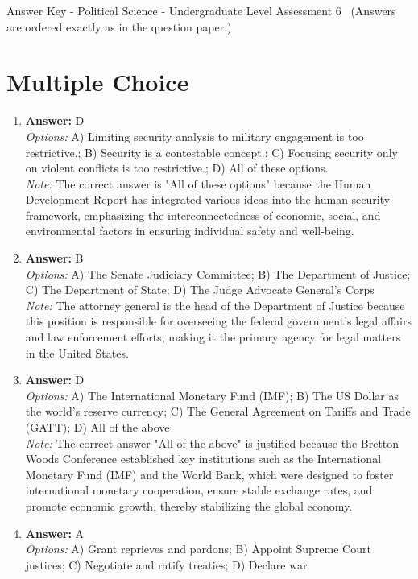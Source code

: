 \documentclass[12pt]{article}
\begin{document}
\begin{center}
Answer Key - Political Science - Undergraduate Level Assessment 6 \
\small (Answers are ordered exactly as in the question paper.)
\end{center}

\section*{Multiple Choice}
\begin{enumerate}[label=\arabic*.]
\item \textbf{Answer:} D
\\ \textit{Options:} A) Limiting security analysis to military engagement is too restrictive.; B) Security is a contestable concept.; C) Focusing security only on violent conflicts is too restrictive.; D) All of these options.
\\ \textit{Note:} The correct answer is "All of these options" because the Human Development Report has integrated various ideas into the human security framework, emphasizing the interconnectedness of economic, social, and environmental factors in ensuring individual safety and well-being.
\item \textbf{Answer:} B
\\ \textit{Options:} A) The Senate Judiciary Committee; B) The Department of Justice; C) The Department of State; D) The Judge Advocate General's Corps
\\ \textit{Note:} The attorney general is the head of the Department of Justice because this position is responsible for overseeing the federal government's legal affairs and law enforcement efforts, making it the primary agency for legal matters in the United States.
\item \textbf{Answer:} D
\\ \textit{Options:} A) The International Monetary Fund (IMF); B) The US Dollar as the world's reserve currency; C) The General Agreement on Tariffs and Trade (GATT); D) All of the above
\\ \textit{Note:} The correct answer "All of the above" is justified because the Bretton Woods Conference established key institutions such as the International Monetary Fund (IMF) and the World Bank, which were designed to foster international monetary cooperation, ensure stable exchange rates, and promote economic growth, thereby stabilizing the global economy.
\item \textbf{Answer:} A
\\ \textit{Options:} A) Grant reprieves and pardons; B) Appoint Supreme Court justices; C) Negotiate and ratify treaties; D) Declare war

\end{enumerate}
\end{document}
